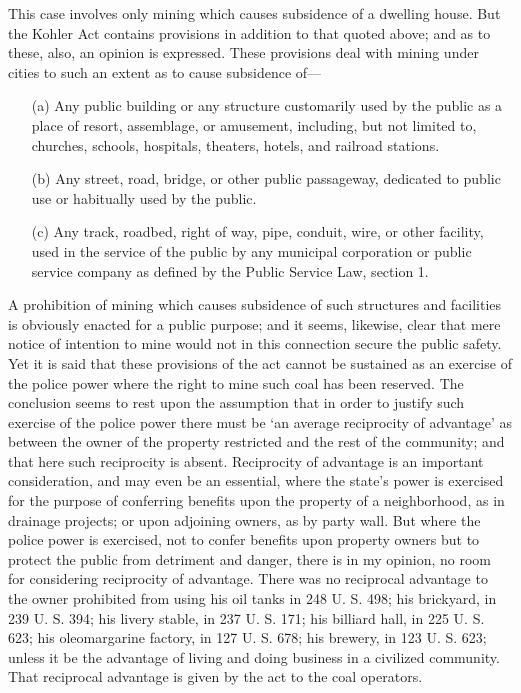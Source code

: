 This case involves only mining which causes subsidence of a dwelling house. But
the Kohler Act contains provisions in addition to that quoted above; and as to
these, also, an opinion is expressed. These provisions deal with mining under
cities to such an extent as to cause subsidence of---
\begin{itemize}
\item[(a)] Any public building or any structure customarily used by the public
as a place of resort, assemblage, or amusement, including, but not limited to,
churches, schools, hospitals, theaters, hotels, and railroad stations.

\item[(b)] Any street, road, bridge, or other public passageway, dedicated to
public use or habitually used by the public.

\item[(c)] Any track, roadbed, right of way, pipe, conduit, wire, or other
facility, used in the service of the public by any municipal corporation or
public service company as defined by the Public Service Law, section 1.
\end{itemize}
A prohibition of mining which causes subsidence of such structures and
facilities is obviously enacted for a public purpose; and it seems, likewise,
clear that mere notice of intention to mine would not in this connection secure
the public safety. Yet it is said that these provisions of the act cannot be
sustained as an exercise of the police power where the right to mine such coal
has been reserved. The conclusion seems to rest upon the assumption that in
order to justify such exercise of the police power there must be `an average
reciprocity of advantage' as between the owner of the property restricted and
the rest of the community; and that here such reciprocity is absent. Reciprocity
of advantage is an important consideration, and may even be an essential, where
the state's power is exercised for the purpose of conferring benefits upon the
property of a neighborhood, as in drainage projects; or upon adjoining owners,
as by party wall. But where the police power is exercised, not to confer
benefits upon property owners but to protect the public from detriment and
danger, there is in my opinion, no room for considering reciprocity of
advantage. There was no reciprocal advantage to the owner prohibited from using
his oil tanks in 248 U. S. 498; his brickyard, in 239 U. S. 394; his livery
stable, in 237 U. S. 171; his billiard hall, in 225 U. S. 623; his oleomargarine
factory, in 127 U. S. 678; his brewery, in 123 U. S. 623; unless it be the
advantage of living and doing business in a civilized community. That reciprocal
advantage is given by the act to the coal operators.

